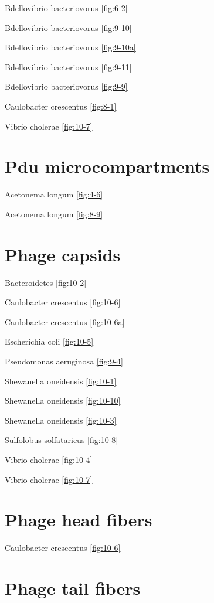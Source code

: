 \documentclass[]{tufte-book}
\begin{document}
Bdellovibrio bacteriovorus \ref{fig:6-2}

Bdellovibrio bacteriovorus \ref{fig:9-10}

Bdellovibrio bacteriovorus \ref{fig:9-10a}

Bdellovibrio bacteriovorus \ref{fig:9-11}

Bdellovibrio bacteriovorus \ref{fig:9-9}

Caulobacter crescentus \ref{fig:8-1}

Vibrio cholerae \ref{fig:10-7}

\section*{Pdu microcompartments}\label{pdu-microcompartments}

Acetonema longum \ref{fig:4-6}

Acetonema longum \ref{fig:8-9}

\section*{Phage capsids}\label{phage-capsids}

Bacteroidetes \ref{fig:10-2}

Caulobacter crescentus \ref{fig:10-6}

Caulobacter crescentus \ref{fig:10-6a}

Escherichia coli \ref{fig:10-5}

Pseudomonas aeruginosa \ref{fig:9-4}

Shewanella oneidensis \ref{fig:10-1}

Shewanella oneidensis \ref{fig:10-10}

Shewanella oneidensis \ref{fig:10-3}

Sulfolobus solfataricus \ref{fig:10-8}

Vibrio cholerae \ref{fig:10-4}

Vibrio cholerae \ref{fig:10-7}

\section*{Phage head fibers}\label{phage-head-fibers}

Caulobacter crescentus \ref{fig:10-6}

\section*{Phage tail fibers}\label{phage-tail-fibers}
\end{document}
